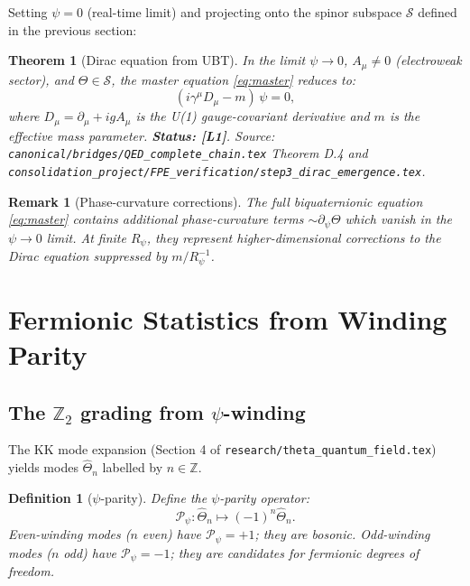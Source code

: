 \documentclass[11pt,a4paper]{article}
\newtheorem{theorem}{Theorem}
\newtheorem{definition}{Definition}
\newtheorem{remark}{Remark}
\begin{document}
Setting $\psi = 0$ (real-time limit) and projecting onto the spinor subspace
$\mathcal{S}$ defined in the previous section:

\begin{theorem}[Dirac equation from UBT]\label{thm:dirac}
  In the limit $\psi \to 0$, $A_\mu \neq 0$ (electroweak sector), and
  $\Theta \in \mathcal{S}$, the master equation \eqref{eq:master} reduces to:
  \begin{equation}
  \label{eq:dirac}
    (i\gamma^\mu D_\mu - m)\,\psi = 0,
  \end{equation}
  where $D_\mu = \partial_\mu + igA_\mu$ is the U(1) gauge-covariant derivative
  and $m$ is the effective mass parameter.
  \textbf{Status: [L1]}.
  Source: \texttt{canonical/bridges/QED\_complete\_chain.tex} Theorem D.4 and
  \texttt{consolidation\_project/FPE\_verification/step3\_dirac\_emergence.tex}.
\end{theorem}

\begin{remark}[Phase-curvature corrections]
  The full biquaternionic equation \eqref{eq:master} contains additional
  phase-curvature terms $\sim \partial_\psi\Theta$ which vanish in the
  $\psi \to 0$ limit.  At finite $R_\psi$, they represent higher-dimensional
  corrections to the Dirac equation suppressed by $m/R_\psi^{-1}$.
\end{remark}

\section{Fermionic Statistics from Winding Parity}
\label{sec:winding}

\subsection{The \texorpdfstring{$\mathbb{Z}_2$}{Z2} grading from \texorpdfstring{$\psi$}{psi}-winding}

The KK mode expansion (Section 4 of \texttt{research/theta\_quantum\_field.tex}) yields
modes $\hat\Theta_n$ labelled by $n \in \mathbb{Z}$.

\begin{definition}[$\psi$-parity]\label{def:psi_parity}
  Define the $\psi$-parity operator:
  \begin{equation}
    \mathcal{P}_\psi\colon \hat\Theta_n \mapsto (-1)^n \hat\Theta_n.
  \end{equation}
  Even-winding modes ($n$ even) have $\mathcal{P}_\psi = +1$; they are
  \emph{bosonic}.  Odd-winding modes ($n$ odd) have $\mathcal{P}_\psi = -1$;
  they are candidates for \emph{fermionic} degrees of freedom.
\end{definition}
\end{document}
